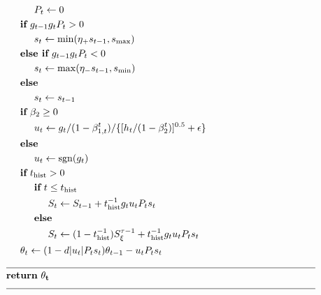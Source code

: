 \documentclass[11pt,a4paper]{article}
\begin{document}
$$\begin{aligned}
    &\hspace{10mm} P_t \leftarrow 0 \\
    &\hspace{5mm} \textbf{if}\ g_{t-1} g_t P_t > 0 \\
    &\hspace{10mm} s_t \leftarrow \mathrm{min}(\eta_+ s_{t-1}, s_\mathrm{max}) \\
    &\hspace{5mm} \textbf{else if}\ g_{t-1} g_t P_t < 0 \\
    &\hspace{10mm} s_t \leftarrow \mathrm{max}(\eta_- s_{t-1}, s_\mathrm{min}) \\
    &\hspace{5mm} \textbf{else} \\
    &\hspace{10mm} s_t \leftarrow s_{t-1} \\
    &\hspace{5mm} \textbf{if}\ \beta_2 \geq 0 \\
    &\hspace{10mm} u_t \leftarrow g_t / (1-\beta_{1,t}^t) / \{[h_t/(1-\beta_2^t)]^{0.5}+\epsilon\} \\
    &\hspace{5mm} \textbf{else} \\
    &\hspace{10mm} u_t \leftarrow \mathrm{sgn}(g_t) \\
    &\hspace{5mm} \textbf{if}\ t_\mathrm{hist} > 0\\
    &\hspace{10mm} \textbf{if}\ t \leq t_\mathrm{hist}\\
    &\hspace{15mm} S_t \leftarrow S_{t-1} + t_\mathrm{hist}^{-1} g_t u_t P_t s_t\\
    &\hspace{10mm} \textbf{else} \\
    &\hspace{15mm} S_t \leftarrow (1-t_\mathrm{hist}^{-1}) S_\xi^{\tau-1}
                   + t_\mathrm{hist}^{-1} g_t u_t P_t s_t\\
    &\hspace{5mm}\theta_t \leftarrow (1-d|u_t|P_ts_t) \theta_{t-1} - u_t P_t s_t \\
    &\rule{111mm}{0.4pt} \\[-1.ex]
    &\bf{return}\ \theta_t \\[-1.ex]
    &\rule{111mm}{0.4pt} \\[-1.ex]
\end{aligned}
$$
\end{document}
